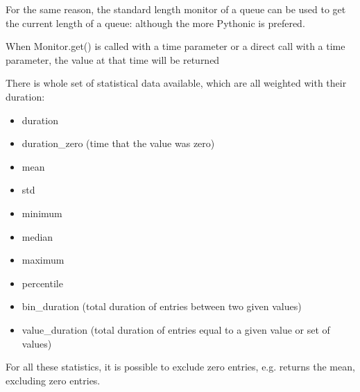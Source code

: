 \documentclass[letterpaper,10pt,english]{sphinxmanual}
\begin{document}
For the same reason, the standard length monitor of a queue can be used to get the current length of a queue:  although
the more Pythonic  is prefered.

When Monitor.get() is called with a time parameter or a direct call with a time parameter, the value at that time will be returned

%
\begin{sphinxVerbatim}[commandchars=\\\{\}]
   
   
\end{sphinxVerbatim}

There is whole set of statistical data available, which are all weighted with their duration:
\begin{itemize}
\item {} 
duration

\item {} 
duration\_zero (time that the value was zero)

\item {} 
mean

\item {} 
std

\item {} 
minimum

\item {} 
median

\item {} 
maximum

\item {} 
percentile

\item {} 
bin\_duration (total duration of entries between two given values)

\item {} 
value\_duration (total duration of entries equal to a given value or set of values)

\end{itemize}

For all these statistics, it is possible to exclude zero entries, e.g.  returns the mean, excluding zero entries.
\end{document}
